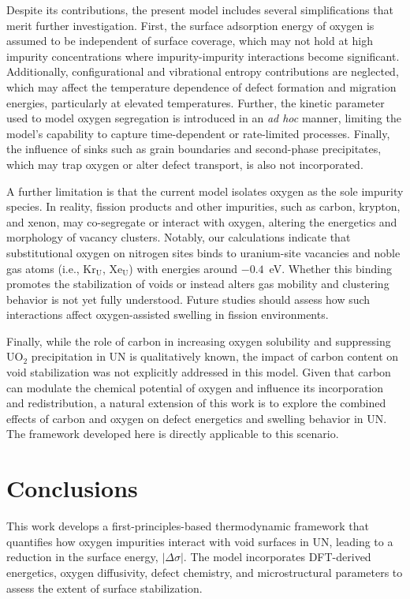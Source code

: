 \documentclass[preprint,12pt,sort&compress]{elsarticle}
\newcommand{\?}{\stackrel{?}{=}}
\begin{document}
Despite its contributions, the present model includes several simplifications that merit further investigation. First, the surface adsorption energy of oxygen is assumed to be independent of surface coverage, which may not hold at high impurity concentrations where impurity-impurity interactions become significant. Additionally, configurational and vibrational entropy contributions are neglected, which may affect the temperature dependence of defect formation and migration energies, particularly at elevated temperatures. Further, the kinetic parameter used to model oxygen segregation is introduced in an \textit{ad hoc} manner, limiting the model's capability to capture time-dependent or rate-limited processes. Finally, the influence of sinks such as grain boundaries and second-phase precipitates, which may trap oxygen or alter defect transport, is also not incorporated.

A further limitation is that the current model isolates oxygen as the sole impurity species. In reality, fission products and other impurities, such as carbon, krypton, and xenon, may co-segregate or interact with oxygen, altering the energetics and morphology of vacancy clusters. Notably, our calculations indicate that substitutional oxygen on nitrogen sites binds to uranium-site vacancies and noble gas atoms (i.e., Kr$_\text{U}$, Xe$_\text{U}$) with energies around $-0.4$~eV. Whether this binding promotes the stabilization of voids or instead alters gas mobility and clustering behavior is not yet fully understood. Future studies should assess how such interactions affect oxygen-assisted swelling in fission environments.

Finally, while the role of carbon in increasing oxygen solubility and suppressing UO$_2$ precipitation in UN is qualitatively known, the impact of carbon content on void stabilization was not explicitly addressed in this model. Given that carbon can modulate the chemical potential of oxygen and influence its incorporation and redistribution, a natural extension of this work is to explore the combined effects of carbon and oxygen on defect energetics and swelling behavior in UN. The framework developed here is directly applicable to this scenario.

\section{Conclusions}

This work develops a first-principles-based thermodynamic framework that quantifies how oxygen impurities interact with void surfaces in UN, leading to a reduction in the surface energy, $|\Delta \sigma|$. The model incorporates DFT-derived energetics, oxygen diffusivity, defect chemistry, and microstructural parameters to assess the extent of surface stabilization.
\end{document}
